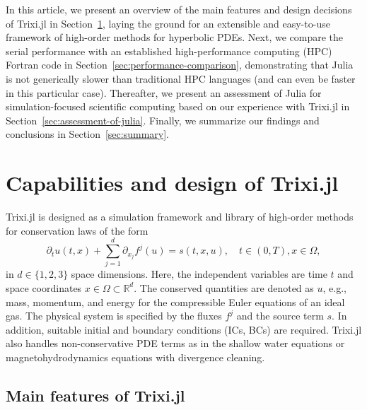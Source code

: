 \documentclass[hidelinks]{juliacon} %
\makeatletter
\newcommand{\eg}[0]{{e.g.\@}\xspace}
\newcommand{\trixi}{Trixi.jl\xspace}
\makeatother
\begin{document}
In this article, we present an overview of the main features and design decisions
of \trixi in Section~\ref{sec:design-of-trixi}, laying the ground for an extensible
and easy-to-use framework of high-order methods for hyperbolic PDEs. Next, we
compare the serial performance with an established high-performance computing (HPC) Fortran code in
Section~\ref{sec:performance-comparison}, demonstrating that Julia is not generically
slower than traditional HPC languages (and can even be faster in this particular case).
Thereafter, we present an assessment of Julia for simulation-focused scientific
computing based on our experience with \trixi in Section~\ref{sec:assessment-of-julia}.
Finally, we summarize our findings and conclusions in Section~\ref{sec:summary}.



\section{Capabilities and design of \trixi}
\label{sec:design-of-trixi}

\trixi is designed as a simulation framework and library of high-order methods for conservation laws
of the form
\begin{equation}
\label{eq:hcl}
  \partial_t u(t, x) + \sum_{j=1}^d \partial_{x_j} f^j(u) = s(t, x, u),
  \quad t \in (0, T), x \in \Omega,
\end{equation}
in $d \in \{1, 2, 3\}$ space dimensions. Here, the independent variables are
time $t$ and space coordinates $x \in \Omega \subset \mathbb{R}^d$. The conserved
quantities are denoted as $u$, \eg, mass, momentum, and energy for the compressible
Euler equations of an ideal gas.
The physical system is specified by the fluxes $f^j$ and the source term $s$.
In addition, suitable initial and boundary conditions (ICs, BCs) are required.
\trixi also handles non-conservative PDE terms as in the shallow water equations or magnetohydrodynamics equations
with divergence cleaning.


\subsection{Main features of \trixi}
\end{document}
